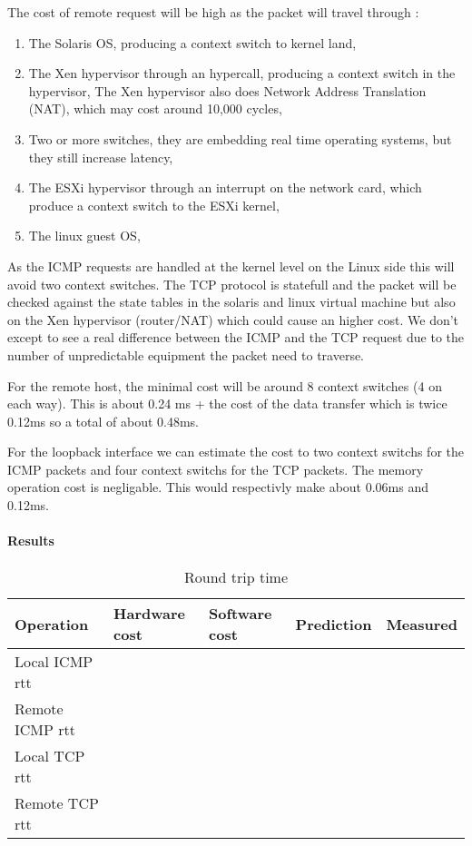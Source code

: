 The cost of remote request will be high as the packet will travel through :
\begin{enumerate}
\item The Solaris OS, producing a context switch to kernel land,
\item The Xen hypervisor through an hypercall, producing a context switch in the
hypervisor,
The Xen hypervisor also does Network Address Translation (NAT), which may cost
around 10,000 cycles,
\item Two or more switches, they are embedding real time operating systems,
but they still increase latency,
\item The ESXi hypervisor through an interrupt on the network card, which
produce a context switch to the ESXi kernel,
\item The linux guest OS,
\end{enumerate}

As the ICMP requests are handled at the kernel level on the Linux side this will
avoid two context switches.
The TCP protocol is statefull and the packet will be checked against the state
tables in the solaris and linux virtual machine but also on the Xen hypervisor
(router/NAT) which could cause an higher cost.
We don't except to see a real difference between the ICMP and the TCP request
due to the number of unpredictable equipment the packet need to traverse.

For the remote host, the minimal cost will be around 8 context switches (4 on
each way).
This is about 0.24 ms + the cost of the data transfer which is twice 0.12ms so a total of
about 0.48ms.

For the loopback interface we can estimate the cost to two context switchs for
the ICMP packets and four context switchs for the TCP packets.
The memory operation cost is negligable.
This would respectivly make about 0.06ms and 0.12ms.




\paragraph{Results}
\begin{table}[h]
\begin{center}
\begin{tabular}{| l | l | l | l | l |}
\hline
Operation 			& Hardware cost 	& Software cost 		& Prediction 		& Measured \\
\hline
Local ICMP rtt		&				&					&				& 		\\
\hline
Remote ICMP rtt		&				&					&				& 		\\
\hline
Local TCP rtt		&				&					&				& 		\\
\hline
Remote TCP rtt		&				&					&				& 		\\
\hline


\end{tabular}
\end{center}
\caption{Round trip time\label{tab:rtt}}
\end{table}

